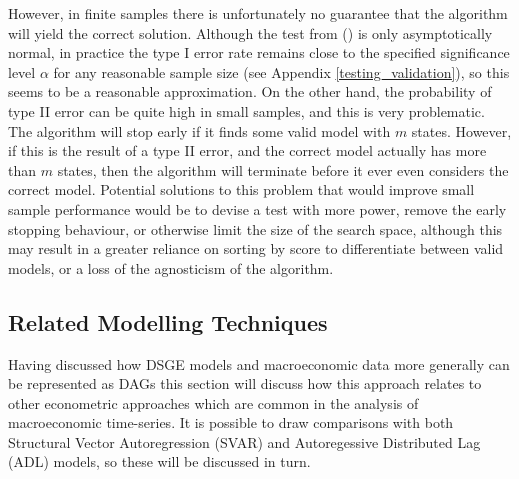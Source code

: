 \documentclass{article}
\begin{document}
However, in finite samples there is unfortunately no guarantee that the algorithm will yield the correct solution. Although the test from \citeauthor{srivastava2005some} (\citeyear{srivastava2005some}) is only asymptotically normal, in practice the type I error rate remains close to the specified significance level $\alpha$ for any reasonable sample size (see Appendix \ref{testing_validation}), so this seems to be a reasonable approximation. On the other hand, the probability of type II error can be quite high in small samples, and this is very problematic. The algorithm will stop early if it finds some valid model with $m$ states. However, if this is the result of a type II error, and the correct model actually has more than $m$ states, then the algorithm will terminate before it ever even considers the correct model. Potential solutions to this problem that would improve small sample performance would be to devise a test with more power, remove the early stopping behaviour, or otherwise limit the size of the search space, although this may result in a greater reliance on sorting by score to differentiate between valid models, or a loss of the agnosticism of the algorithm.

\subsection{Related Modelling Techniques}

Having discussed how DSGE models and macroeconomic data more generally can be represented as DAGs this section will discuss how this approach relates to other econometric approaches which are common in the analysis of macroeconomic time-series. It is possible to draw comparisons with both Structural Vector Autoregression (SVAR) and Autoregessive Distributed Lag (ADL) models, so these will be discussed in turn.
\end{document}
